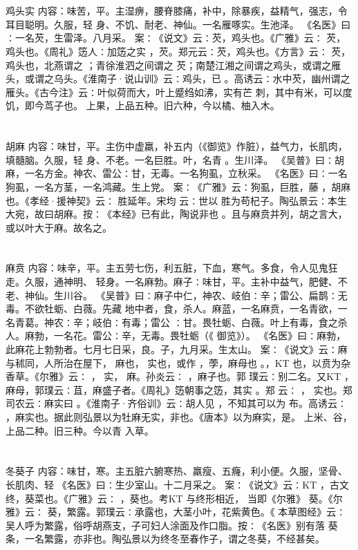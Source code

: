 \documentclass[12pt,UTF8]{ctexbook}
\begin{document}
\section{}鸡头实
内容：味苦，平。主湿痹，腰脊膝痛，补中，除暴疾，益精气，强志，令耳目聪明。久服，轻 
身、不饥、耐老、神仙。一名雁啄实。生池泽。 
《名医》曰∶一名芡，生雷泽。八月采。 
案∶《说文》云∶芡，鸡头也。《广雅》云∶ 芡，鸡头也。《周礼》笾人∶加笾之实 
，芡。郑元云∶芡，鸡头也。《方言》云∶ 芡，鸡头也，北燕谓之 ；青徐淮泗之间谓之 
芡；南楚江湘之间谓之鸡头，或谓之雁头，或谓之乌头。《淮南子·说山训》云∶鸡头，已 
。高诱云∶水中芡，幽州谓之雁头。《古今注》云∶叶似荷而大，叶上蹙绉如沸，实有芒 
刺，其中有米，可以度饥，即今茑子也。 
上果，上品五种。旧六种，今以橘、柚入木。 


\section{}胡麻
内容：味甘，平。主伤中虚羸，补五内（《御览》作脏），益气力，长肌肉，填髓脑。久服，轻 
身、不老。一名巨胜。叶，名青 。生川泽。 
《吴普》曰∶胡麻，一名方金。神农、雷公∶甘，无毒。一名狗虱，立秋采。 
《名医》曰∶一名狗虱，一名方茎，一名鸿藏。生上党。 
案∶《广雅》云∶狗虱，巨胜，藤 ，胡麻也。《孝经·援神契》云∶ 胜延年。宋均 
云∶世以 胜为苟杞子。陶弘景云∶本生大宛，故曰胡麻。按∶《本经》已有此，陶说非也 
。且与麻贲并列，胡之言大，或以叶大于麻。故名之。 


\section{}麻贲
内容：味辛，平。主五劳七伤，利五脏，下血，寒气。多食，令人见鬼狂走。久服，通神明、 
轻身。一名麻勃。麻子∶味甘，平。主补中益气，肥健、不老、神仙。生川谷。 
《吴普》曰∶麻子中仁，神农、岐伯∶辛；雷公、扁鹊∶无毒。不欲牡蛎、白薇。先藏 
地中者，食，杀人。麻蓝，一名麻贲，一名青欲，一名青葛。神农∶辛；岐伯∶有毒；雷公 
∶甘。畏牡蛎、白薇。叶上有毒，食之杀人。麻勃，一名花。雷公∶辛，无毒。畏牡蛎（《 
御览》）。 
《名医》曰∶麻勃，此麻花上勃勃者。七月七日采，良。子，九月采。生太山。 
案∶《说文》云∶麻与秫同，人所治在屋下， 麻也， 实也，或作 ，荸，麻母也 
。，KT 也，以贲为杂 香草。《尔雅》云∶ ， 实， 麻。孙炎云∶ ，麻子也。郭 
璞云∶别二名。又KT ，麻母，郭璞云∶苴，麻盛子者。《周礼》笾朝事之笾，其实 。郑 
云∶ ， 实也。郑司农云∶麻实曰 。《淮南子·齐俗训》云∶胡人见 ，不知其可以为 
布。高诱云∶ ，麻实也。据此则弘景以为牡麻无实，非也。《唐本》以为麻实，是。 
上米、谷，上品二种。旧三种。今以青 入草。 


\section{}冬葵子
内容：味甘，寒。主五脏六腑寒热、羸瘦、五癃，利小便。久服，坚骨、长肌肉、轻 
《名医》曰∶生少室山。十二月采之。 
案∶《说文》云∶KT ，古文终，葵菜也。《广雅》云∶ ，葵也。考KT 与终形相近， 
当即《尔雅》 葵。《尔雅》云∶ 葵，繁露。郭璞云∶承露也，大茎小叶，花紫黄色。《 
本草图经》云∶吴人呼为繁露，俗呼胡燕支，子可妇人涂面及作口脂。按∶《名医》别有落 
葵条，一名繁露，亦非也。陶弘景以为终冬至春作子，谓之冬葵，不经甚矣。 
\end{document}
